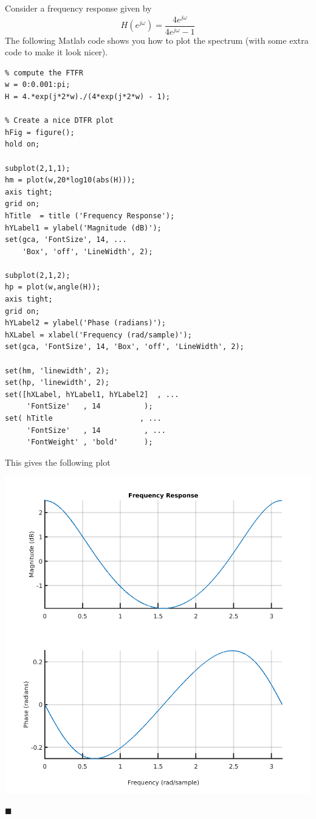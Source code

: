\begin{example} Consider a frequency response given by
  \[
  H\left(e^{j\omega}\right) = \frac{4e^{j\omega}}{4e^{j\omega} - 1} 
  \]
  The following Matlab code shows you how to plot the spectrum (with some extra code to make it look nicer).
  
\begin{verbatim}
% compute the FTFR
w = 0:0.001:pi;
H = 4.*exp(j*2*w)./(4*exp(j*2*w) - 1);

% Create a nice DTFR plot 
hFig = figure();
hold on;

subplot(2,1,1);
hm = plot(w,20*log10(abs(H)));
axis tight;
grid on;
hTitle  = title ('Frequency Response');
hYLabel1 = ylabel('Magnitude (dB)');
set(gca, 'FontSize', 14, ...
    'Box', 'off', 'LineWidth', 2);

subplot(2,1,2);
hp = plot(w,angle(H));
axis tight;
grid on;
hYLabel2 = ylabel('Phase (radians)');
hXLabel = xlabel('Frequency (rad/sample)');
set(gca, 'FontSize', 14, 'Box', 'off', 'LineWidth', 2);

set(hm, 'linewidth', 2);
set(hp, 'linewidth', 2);
set([hXLabel, hYLabel1, hYLabel2]  , ...
     'FontSize'   , 14          );
set( hTitle                    , ...
     'FontSize'   , 14          , ...
     'FontWeight' , 'bold'      );
\end{verbatim}
This gives the following plot
\begin{center}
\includegraphics[scale=0.5]{graphics/lecture21_1.png}
\end{center}

$\blacksquare$
\end{example}

